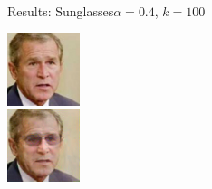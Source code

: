 \documentclass[11pt]{beamer}
\begin{document}
\begin{frame}{Results: Sunglasses}{$\alpha=0.4$, $k=100$}
\begin{minipage}{81px}
	\end{minipage}%
	\begin{minipage}{81px}
		\includegraphics[width=80px]{../pictures/outputs/start-imgs/Bush.png}\\
		\includegraphics[width=80px]{../pictures/outputs/sunglasses_alpha0.4_k100/Bush.png}
	\end{minipage}
\end{frame}

\end{document}
